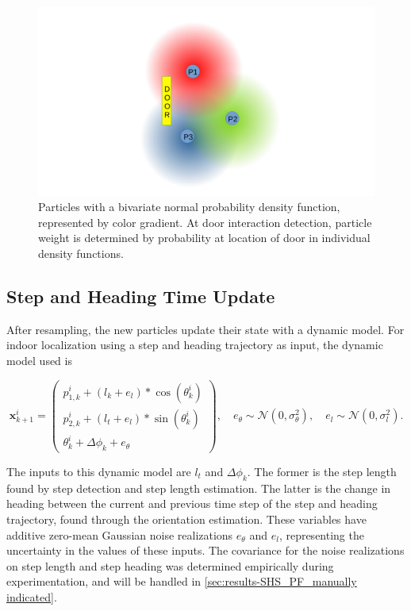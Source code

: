 	\begin{figure}[]
			\centering
			\includegraphics[trim=240 0 220 0, clip, width=0.35\linewidth]{images/pf_diagram}
					\setlength{\belowcaptionskip}{-10pt}
			\caption{ Particles with a bivariate normal probability density function, represented by color gradient. At door interaction detection, particle weight is determined by probability at location of door in individual density functions.}
			\label{fig:pfdiagram}
	\end{figure}
	
	
\subsection{Step and Heading Time Update}
\label{sec:meth-pf-SHS_time_update}
	After resampling, the new particles update their state with a dynamic model. For indoor localization using a step and heading trajectory as input, the dynamic model used is
	
	\begin{equation}
		\label{eq:SHS_dynamic_model_with_noise}
		\mathbf{x}^i_{k + 1}
		=
		\left(\begin{array}{l}
			p_{1,k}^i + (l_{k} + e_l) * \cos (\theta_{k}^i) \\
			p_{2,k}^i + (l_{t} + e_l) * \sin (\theta_{k}^i) \\
			\theta_{k}^i + \Delta \phi_k + e_\theta 
		\end{array}\right), \quad
		e_{\theta} \sim \mathcal{N}\left(0, \sigma_{\theta}^{2}\right), \quad e_{l} \sim \mathcal{N}\left(0, \sigma_{l}^{2}\right).
	\end{equation}

The inputs to this dynamic model are $l_{t}$ and $\Delta \phi_k$. The former is the step length found by step detection and step length estimation. The latter is the change in heading between the current and previous time step of the step and heading trajectory, found through the orientation estimation. These variables have additive zero-mean Gaussian noise realizations $e_{\theta}$ and $e_{l}$, representing the uncertainty in the values of these inputs. The covariance for the noise realizations on step length and step heading was determined empirically during experimentation, and will be handled in \cref{sec:results-SHS_PF_manually indicated}.\par 

